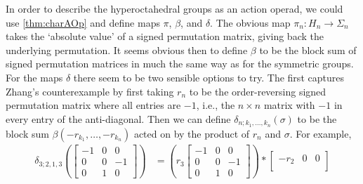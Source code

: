 \begin{example}
In order to describe the hyperoctahedral groups as an action operad, we could use \cref{thm:charAOp} and define maps $\pi$, $\beta$, and $\delta$. The obvious map $\pi_n \colon H_n \rightarrow \Sigma_n$ takes the `absolute value' of a signed permutation matrix, giving back the underlying permutation. It seems obvious then to define $\beta$ to be the block sum of signed permutation matrices in much the same way as for the symmetric groups. 
For the maps $\delta$ there seem to be two sensible options to try. The first captures Zhang's counterexample by first taking $r_n$ to be the order-reversing signed permutation matrix where all entries are $-1$, i.e., the $n \times n$ matrix with $-1$ in every entry of the anti-diagonal. Then we can define $\delta_{n;k_1,\ldots,k_n}(\sigma)$ to be the block sum $\beta(-r_{k_1},\ldots,-r_{k_n})$ acted on by the product of $r_n$ and $\sigma$. For example,
  \begin{align*}
    \delta_{3;2,1,3}\left(
    \begin{bmatrix}
      -1 & 0 & 0 \\
      0 & 0 & -1 \\
      0 & 1 & 0
      \end{bmatrix}
      \right)
      &=
      \left(
      r_3
      \begin{bmatrix}
      -1 & 0 & 0 \\
      0 & 0 & -1 \\
      0 & 1 & 0
      \end{bmatrix}
      \right)
      \ast
      \begin{bmatrix}
      -r_2 & 0 & 0 \\

\end{bmatrix}
\end{align*}
\end{example}
